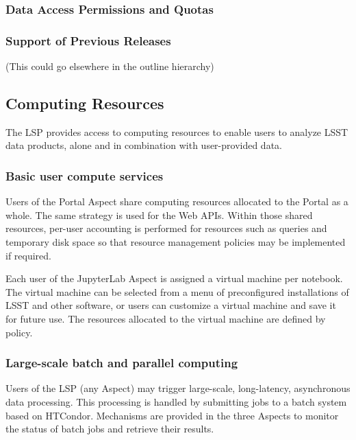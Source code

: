 \subsubsection{Data Access Permissions and Quotas}\label{data-access-permissions-and-quotas}

\subsubsection{Support of Previous Releases}\label{support-of-previous-releases}

(This could go elsewhere in the outline hierarchy)

\subsection{Computing Resources}\label{computing-resources}

The LSP provides access to computing resources to enable users to analyze
LSST data products, alone and in combination with user-provided data.

\subsubsection{Basic user compute services}\label{basic-user-compute-services}

Users of the Portal Aspect share computing resources allocated to the Portal as
a whole.  The same strategy is used for the Web APIs.  Within those shared
resources, per-user accounting is performed for resources such as queries and
temporary disk space so that resource management policies may be implemented
if required.

Each user of the JupyterLab Aspect is assigned a virtual machine per notebook.
The virtual machine can be selected from a menu of preconfigured installations
of LSST and other software, or users can customize a virtual machine and save
it for future use.  The resources allocated to the virtual machine are
defined by policy.

\subsubsection{Large-scale batch and parallel computing}\label{large-scale-batch-and-parallel-computing}

Users of the LSP (any Aspect) may trigger large-scale, long-latency,
asynchronous data processing.  This processing is handled by submitting
jobs to a batch system based on HTCondor.  Mechanisms are provided in the
three Aspects to monitor the status of batch jobs and retrieve their results.

